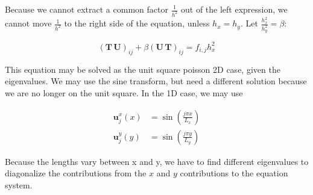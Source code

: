 Because we cannot extract a common factor $\frac{1}{h^2}$ out of the left expression, we cannot move $\frac{1}{h^2}$ to the right side of the equation, unless $h_x = h_y$. Let $\frac{h_x^2}{h_y^2} = \beta$:

\begin{equation}
(\mathbf{{T}} \, \mathbf{{U}})_{ij} +\beta (\mathbf{{U}} \, \mathbf{{T}})_{ij} = f_{i,j} h_x^2
\end{equation}

This equation may be solved as the unit square poisson 2D case, given the eigenvalues. We may use the sine transform, but need a different solution because we are no longer on the unit square. In the 1D case, we may use 

\begin{align}
  \mathbf{u}_j^x(x) &= \sin(\frac{j \pi x}{L_x}) \\
  \mathbf{u}_j^y(y) &= \sin(\frac{j \pi y}{L_y})
\end{align}

Because the lengths vary between x and y, we have to find different eigenvalues to diagonalize the contributions from the $x$ and $y$ contributions to the equation system.
